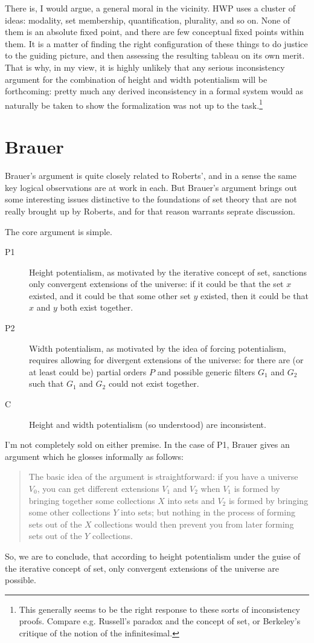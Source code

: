 \documentclass{article}
\begin{document}
There is, I would argue, a general moral in the vicinity.
HWP uses a cluster of ideas: modality, set membership, quantification, plurality, 
and so on. None of them is an absolute fixed point, and there are few 
conceptual fixed points within them. It is a matter of finding the right configuration 
of these things to do justice to the guiding picture, and then assessing 
the resulting tableau on its own merit. That is why, in my view,
it is highly unlikely that any serious inconsistency argument for the combination of
height and width potentialism will be forthcoming: 
pretty much any derived inconsistency  in a formal system would as naturally 
be taken to show 
the formalization was not up to the task.\footnote{This 
generally seems to be the right response to these sorts of inconsistency proofs.
Compare e.g. Russell's paradox and the concept of set, or Berkeley's 
critique of the notion of the infinitesimal.}

\section{Brauer}
Brauer's argument is quite closely related to Roberts', and in a sense the 
same key logical observations are at work in each. But Brauer's argument brings 
out some interesting issues distinctive to the foundations of set theory 
that are not really brought up by Roberts, and for that reason 
warrants seprate discussion.

The core argument is simple.
\begin{description}
    \item[P1] Height potentialism, as motivated by the iterative concept of set,
    sanctions only convergent extensions of the universe: if it could be that 
    the set $x$ existed, and it could be that some other set $y$ existed, 
    then it could be that $x$ and $y$ 
    both exist together.  
    \item[P2] Width potentialism, as motivated by the idea of forcing potentialism,
    requires allowing for divergent extensions of the universe: 
    for there are (or at least could be) partial orders 
    $P$ and possible generic filters $G_1$ and $G_2$ such that $G_1$ and $G_2$ 
    could not exist together.
    \item[C] Height and width potentialism (so understood) are inconsistent.
\end{description}
I'm not completely sold on either premise. In the case of P1,
Brauer gives an argument which he glosses informally as follows:
\begin{quote}
    The basic idea of the argument is straightforward: 
    if you have a universe $V_0$, you can get different extensions 
    $V_1$ and $V_2$ when $V_1$ 
    is formed by bringing together some collections $X$ into sets and 
    $V_2$ is formed by bringing some other collections $Y$ into sets; 
    but nothing in the process of forming sets out of the 
    $X$ collections would then prevent you from 
    later forming sets out of the $Y$ collections.
\end{quote}
So, we are to conclude, that according to height potentialism under the guise of
the iterative concept of set, only convergent extensions of the universe are possible.
\end{document}

